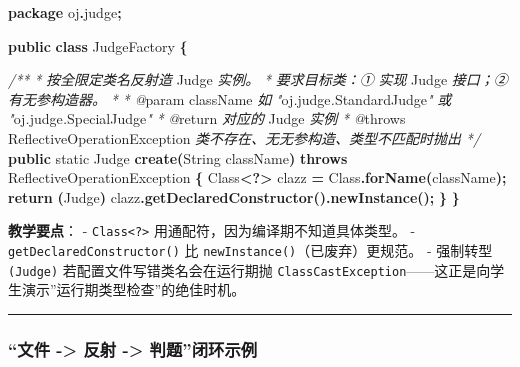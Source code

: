 \documentclass[
  11pt,
]{ctexart}
\newenvironment{Shaded}{\begin{snugshade}}{\end{snugshade}}
\newcommand{\BuiltInTok}[1]{#1}
\newcommand{\CommentTok}[1]{\textcolor[rgb]{0.56,0.35,0.01}{\textit{#1}}}
\newcommand{\ControlFlowTok}[1]{\textcolor[rgb]{0.13,0.29,0.53}{\textbf{#1}}}
\newcommand{\DataTypeTok}[1]{\textcolor[rgb]{0.13,0.29,0.53}{#1}}
\newcommand{\FunctionTok}[1]{\textcolor[rgb]{0.13,0.29,0.53}{\textbf{#1}}}
\newcommand{\ImportTok}[1]{#1}
\newcommand{\KeywordTok}[1]{\textcolor[rgb]{0.13,0.29,0.53}{\textbf{#1}}}
\newcommand{\NormalTok}[1]{#1}
\newcommand{\OperatorTok}[1]{\textcolor[rgb]{0.81,0.36,0.00}{\textbf{#1}}}
\begin{document}
\begin{Shaded}
\begin{Highlighting}[]
\KeywordTok{package}\ImportTok{ oj}\OperatorTok{.}\ImportTok{judge}\OperatorTok{;}

\KeywordTok{public} \KeywordTok{class}\NormalTok{ JudgeFactory }\OperatorTok{\{}

    \CommentTok{/**}
     \CommentTok{*} \CommentTok{按全限定类名反射造}\NormalTok{ Judge }\CommentTok{实例。}
     \CommentTok{*} \CommentTok{要求目标类：①} \CommentTok{实现}\NormalTok{ Judge }\CommentTok{接口；②} \CommentTok{有无参构造器。}
     \CommentTok{*}
\CommentTok{     * @}\NormalTok{param className }\CommentTok{如} \CommentTok{"}\NormalTok{oj}\CommentTok{.}\NormalTok{judge}\CommentTok{.}\NormalTok{StandardJudge}\CommentTok{"} \CommentTok{或} \CommentTok{"}\NormalTok{oj}\CommentTok{.}\NormalTok{judge}\CommentTok{.}\NormalTok{SpecialJudge}\CommentTok{"}
     \CommentTok{*} \CommentTok{@}\NormalTok{return }\CommentTok{对应的}\NormalTok{ Judge }\CommentTok{实例}
     \CommentTok{*} \CommentTok{@}\NormalTok{throws ReflectiveOperationException }\CommentTok{类不存在、无无参构造、类型不匹配时抛出}
     \CommentTok{*/}
    \KeywordTok{public} \DataTypeTok{static}\NormalTok{ Judge }\FunctionTok{create}\OperatorTok{(}\BuiltInTok{String}\NormalTok{ className}\OperatorTok{)} \KeywordTok{throws}\NormalTok{ ReflectiveOperationException }\OperatorTok{\{}
        \BuiltInTok{Class}\OperatorTok{\textless{}?\textgreater{}}\NormalTok{ clazz }\OperatorTok{=} \BuiltInTok{Class}\OperatorTok{.}\FunctionTok{forName}\OperatorTok{(}\NormalTok{className}\OperatorTok{);}
        \ControlFlowTok{return} \OperatorTok{(}\NormalTok{Judge}\OperatorTok{)}\NormalTok{ clazz}\OperatorTok{.}\FunctionTok{getDeclaredConstructor}\OperatorTok{().}\FunctionTok{newInstance}\OperatorTok{();}
    \OperatorTok{\}}
\OperatorTok{\}}
\end{Highlighting}
\end{Shaded}

\textbf{教学要点}： - \texttt{Class\textless{}?\textgreater{}}
用通配符，因为编译期不知道具体类型。 - \texttt{getDeclaredConstructor()}
比 \texttt{newInstance()}（已废弃）更规范。 - 强制转型 \texttt{(Judge)}
若配置文件写错类名会在运行期抛
\texttt{ClassCastException}------这正是向学生演示''运行期类型检查''的绝佳时机。

\begin{center}\rule{0.5\linewidth}{0.5pt}\end{center}

\hypertarget{ux6587ux4ef6---ux53cdux5c04---ux5224ux9898ux95edux73afux793aux4f8b}{%
\subsubsection{``文件 -\textgreater{} 反射 -\textgreater{}
判题''闭环示例}\label{ux6587ux4ef6---ux53cdux5c04---ux5224ux9898ux95edux73afux793aux4f8b}}
\end{document}
